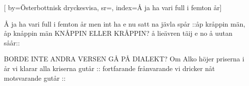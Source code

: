 

[ 		%
	by={Österbottnisk dryckesvisa},					%
	sr={},					%
	index={Å ja ha vari full i femton år}]						%
	


\beginverse*						%
Å ja ha vari full i femton år
men int ha e nu satt na jävla spår
::åp kråppin män, åp knåppin män KNÅPPIN ELLER KRÅPPIN?
å lieävren täij e no å uutan såår::

\endverse							%

\beginverse*
BORDE INTE ANDRA VERSEN GÅ PÅ DIALEKT?						%
Om Alko höjer priserna i år
vi klarar alla kriserna gutår
:: fortfarande frånvarande
vi dricker nåt motsvarande gutår ::
\endverse

\endsong							%